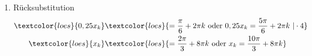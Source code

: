 \begin{minipage}{\textwidth}
{\begin{minipage}{0.5\linewidth}
\begin{enumerate}
				\begin{align*}
					\textcolor{loes}{z_k}&\textcolor{loes}{=\frac{\pi}{6}+2\pi k\text{ oder }z_k=\frac{5\pi}{6}+2\pi k,\ k\in\Z}					
				\end{align*}
				\item Rücksubstitution
				\begin{align*}
					\textcolor{loes}{0,25 x_k}&\textcolor{loes}{=\frac{\pi}{6}+2\pi k\text{ oder }0,25 x_k=\frac{5\pi}{6}+2\pi k\ \vert\cdot 4}\\
					\textcolor{loes}{x_k}&\textcolor{loes}{=\frac{2\pi}{3}+8\pi k\text{ oder }x_k=\frac{10\pi}{3}+8\pi k}
				\end{align*}
			\end{enumerate}
	\end{minipage}}
\end{minipage}
\newpage

